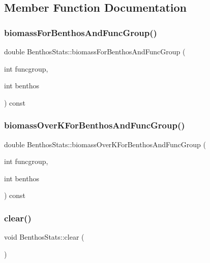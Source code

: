 \subsection{Member Function Documentation}
\mbox{\label{class_benthos_stats_a52417111c3b48a62c7b0cb1276bd1438}} 
\subsubsection{\texorpdfstring{biomassForBenthosAndFuncGroup()}{biomassForBenthosAndFuncGroup()}}
{\footnotesize\ttfamily double Benthos\+Stats\+::biomass\+For\+Benthos\+And\+Func\+Group (\begin{DoxyParamCaption}\item[{int}]{funcgroup,  }\item[{int}]{benthos }\end{DoxyParamCaption}) const}

\mbox{\label{class_benthos_stats_a15507bcae7609f57495e5857b9a773a8}} 
\subsubsection{\texorpdfstring{biomassOverKForBenthosAndFuncGroup()}{biomassOverKForBenthosAndFuncGroup()}}
{\footnotesize\ttfamily double Benthos\+Stats\+::biomass\+Over\+K\+For\+Benthos\+And\+Func\+Group (\begin{DoxyParamCaption}\item[{int}]{funcgroup,  }\item[{int}]{benthos }\end{DoxyParamCaption}) const}

\mbox{\label{class_benthos_stats_a81929a803ffce20c9cf77210de95c8d1}} 
\subsubsection{\texorpdfstring{clear()}{clear()}}
{\footnotesize\ttfamily void Benthos\+Stats\+::clear (\begin{DoxyParamCaption}{ }\end{DoxyParamCaption})}

